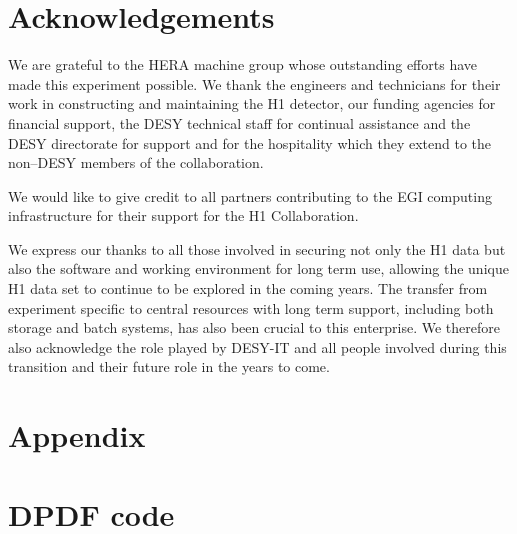 \documentclass[12pt]{article}
\begin{document}

\section*{Acknowledgements}
We are grateful to the HERA machine group whose outstanding
efforts have made this experiment possible.
We thank the engineers and technicians for their work in constructing and
maintaining the H1 detector, our funding agencies for
financial support, the
DESY technical staff for continual assistance
and the DESY directorate for support and for the
hospitality which they extend to the non--DESY
members of the collaboration.

We would like to give credit to all partners contributing to the EGI
computing infrastructure for their support for the H1 Collaboration.  

We express our thanks to all those involved in securing not only the
H1 data but also the software and working environment for long term
use, allowing the unique H1 data set to continue to be explored in the
coming years. The transfer from experiment specific to central
resources with long term support, including both storage and batch
systems, has also been crucial to this enterprise. We therefore also
acknowledge the role played by DESY-IT and all people involved during
this transition and their future role in the years to come.  




\clearpage
\appendix
\section*{Appendix}
\section{DPDF code}
\label{appx:DPDFcode}

%
%




\clearpage

\begin{flushleft}

\end{flushleft}
\end{document}

